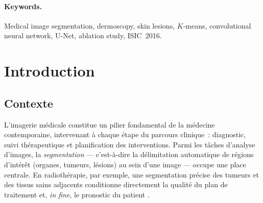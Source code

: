\documentclass[12pt,a4paper]{article}
\begin{document}
\begin{abstract}
Automatic segmentation of skin lesions in dermoscopic images is a key step in computer-aided melanoma diagnosis. This work explores, implements, and compares three approaches of increasing complexity on the ISIC~2016 dataset (900~training images, 379~test images): (i)~unsupervised $K$-means segmentation, evaluated across four colour spaces with ablation on the number of clusters and assignment rule; (ii)~a patch-based CNN, introducing learned convolutions and supervision as an intermediate step; (iii)~a U-Net architecture, optimised through a systematic ablation study spanning 13~hyperparameter axes (24~experiments). Performance tracks model complexity: the LAB $K$-means achieves a Dice coefficient (DSC) of $0.648$ on the test set, the patch CNN $0.760$ ($+0.112$), and the final U-Net $0.882$ ($+0.122$), yielding a Jaccard index of $0.807$ --- competitive with the ISBI~2016 challenge participants. Subgroup analysis by difficulty and paired statistical tests confirm the superiority of supervised methods, especially for small lesions and low-contrast cases.
\end{abstract}

\paragraph*{Keywords.} Medical image segmentation, dermoscopy, skin lesions, $K$-means, convolutional neural network, U-Net, ablation study, ISIC~2016.

\newpage

\tableofcontents
\newpage

\section{Introduction}

\subsection{Contexte}

L'imagerie médicale constitue un pilier fondamental de la médecine contemporaine, intervenant à chaque étape du parcours clinique~: diagnostic, suivi thérapeutique et planification des interventions. Parmi les tâches d'analyse d'images, la \emph{segmentation} --- c'est-à-dire la délimitation automatique de régions d'intérêt (organes, tumeurs, lésions) au sein d'une image --- occupe une place centrale. En radiothérapie, par exemple, une segmentation précise des tumeurs et des tissus sains adjacents conditionne directement la qualité du plan de traitement et, \emph{in fine}, le pronostic du patient \citep{hesamian2019deep}.
\end{document}

